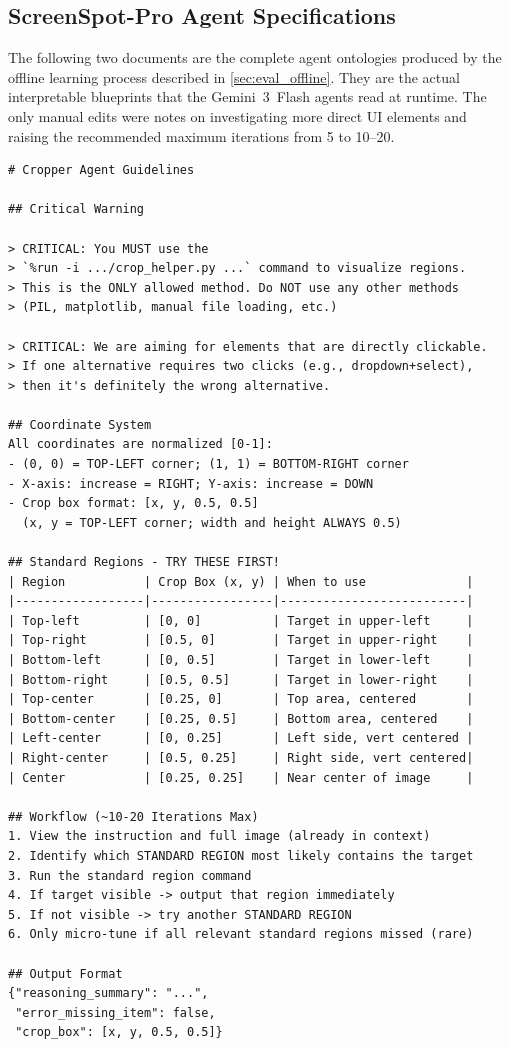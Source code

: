 \subsection{ScreenSpot-Pro Agent Specifications}
\label{sec:app_screenspot}

The following two documents are the complete agent ontologies produced by the offline learning process described in \cref{sec:eval_offline}.
They are the actual interpretable blueprints that the Gemini~3~Flash agents read at runtime.
The only manual edits were notes on investigating more direct UI elements and raising the recommended maximum iterations from 5 to 10--20.

\begin{listing}[H]
{\tiny
\begin{lstlisting}
# Cropper Agent Guidelines

## Critical Warning

> CRITICAL: You MUST use the
> `%run -i .../crop_helper.py ...` command to visualize regions.
> This is the ONLY allowed method. Do NOT use any other methods
> (PIL, matplotlib, manual file loading, etc.)

> CRITICAL: We are aiming for elements that are directly clickable.
> If one alternative requires two clicks (e.g., dropdown+select),
> then it's definitely the wrong alternative.

## Coordinate System
All coordinates are normalized [0-1]:
- (0, 0) = TOP-LEFT corner; (1, 1) = BOTTOM-RIGHT corner
- X-axis: increase = RIGHT; Y-axis: increase = DOWN
- Crop box format: [x, y, 0.5, 0.5]
  (x, y = TOP-LEFT corner; width and height ALWAYS 0.5)

## Standard Regions - TRY THESE FIRST!
| Region           | Crop Box (x, y) | When to use              |
|------------------|-----------------|--------------------------|
| Top-left         | [0, 0]          | Target in upper-left     |
| Top-right        | [0.5, 0]        | Target in upper-right    |
| Bottom-left      | [0, 0.5]        | Target in lower-left     |
| Bottom-right     | [0.5, 0.5]      | Target in lower-right    |
| Top-center       | [0.25, 0]       | Top area, centered       |
| Bottom-center    | [0.25, 0.5]     | Bottom area, centered    |
| Left-center      | [0, 0.25]       | Left side, vert centered |
| Right-center     | [0.5, 0.25]     | Right side, vert centered|
| Center           | [0.25, 0.25]    | Near center of image     |

## Workflow (~10-20 Iterations Max)
1. View the instruction and full image (already in context)
2. Identify which STANDARD REGION most likely contains the target
3. Run the standard region command
4. If target visible -> output that region immediately
5. If not visible -> try another STANDARD REGION
6. Only micro-tune if all relevant standard regions missed (rare)

## Output Format
{"reasoning_summary": "...",
 "error_missing_item": false,
 "crop_box": [x, y, 0.5, 0.5]}
\end{lstlisting}
}
\caption{ScreenSpot-Pro cropper agent ontology (condensed for space).}
\label{lst:cropper_spec}
\end{listing}

